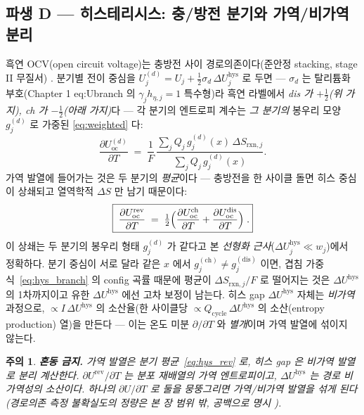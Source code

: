 \documentclass[11pt,a4paper]{article}
\newtheorem*{warnbox}{주의}
\newcommand{\rxn}{\mathrm{rxn}}
\newcommand{\rev}{\mathrm{rev}}
\newcommand{\oc}{\mathrm{oc}}
\newcommand{\hys}{\mathrm{hys}}
\begin{document}
\subsection{파생 D — 히스테리시스: 충/방전 분기와 가역/비가역 분리}\label{ssec:hys}
흑연 OCV(open circuit voltage)는 충방전 사이 경로의존이다(준안정 stacking, stage II 무질서) \cite{hysteresis2018}. 분기별 전이 중심을
$U_j^{(d)}=U_j+\tfrac12\sigma_d\,\Delta U_j^\hys$ 로 두면 — $\sigma_d$ 는 탈리튬화 부호(Chapter 1 eq:Ubranch 의
$\gamma_jh_{\eta,j}{=}1$ 특수형)라 흑연 라벨에서 \emph{dis 가 $+\tfrac12$(위 가지), ch 가 $-\tfrac12$(아래 가지)}다 —
각 분기의 엔트로피 계수는 \emph{그 분기의} 봉우리 모양 $g_j^{(d)}$ 로 가중된 \eqref{eq:weighted} 다:
\begin{equation}
\frac{\partial U_\oc^{(d)}}{\partial T}
\;=\;\frac1F\,\frac{\sum_j Q_j\,g_j^{(d)}(x)\,\Delta S_{\rxn,j}}{\sum_j Q_j\,g_j^{(d)}(x)}.
\label{eq:hys_branch}
\end{equation}
가역 발열에 들어가는 것은 두 분기의 \emph{평균}이다 — 충방전을 한 사이클 돌면 히스 중심이 상쇄되고 열역학적
$\Delta S$ 만 남기 때문이다:
\begin{equation}
\boxed{\;\frac{\partial U_\oc^\rev}{\partial T}
\;=\;\tfrac12\Bigl(\frac{\partial U_\oc^\mathrm{ch}}{\partial T}+\frac{\partial U_\oc^\mathrm{dis}}{\partial T}\Bigr)\;.}
\label{eq:hys_rev}
\end{equation}
이 상쇄는 두 분기의 봉우리 형태 $g_j^{(d)}$ 가 같다고 본 \emph{선형화 근사}($\Delta U_j^\hys\!\ll\!w_j$)에서 정확하다.
분기 중심이 서로 달라 같은 $x$ 에서 $g_j^{(\mathrm{ch})}\!\ne\!g_j^{(\mathrm{dis})}$ 이면, 겹침
가중식~\eqref{eq:hys_branch} 의 config 곡률 때문에 평균이 $\Delta S_{\rxn,j}/F$ 로 떨어지는 것은
$\Delta U^\hys$ 의 1차까지이고 유한 $\Delta U^\hys$ 에선 고차 보정이 남는다.
히스 gap $\Delta U^\hys$ 자체는 \emph{비가역} 과정으로, $\propto I\,\Delta U^\hys$ 의 소산율(한 사이클당
$\propto Q_\mathrm{cycle}\,\Delta U^\hys$ 의 소산(entropy production) 열)을 만든다 — 이는 온도 미분 $\partial/\partial T$ 와 \emph{별개}이며 가역 발열에 섞이지 않는다.
\begin{warnbox}
\textbf{혼동 금지.} 가역 발열은 분기 평균~\eqref{eq:hys_rev} 로, 히스 gap 은 비가역 발열로 \emph{분리} 계산한다.
$\partial U^\rev/\partial T$ 는 분포 재배열의 가역 엔트로피이고, $\Delta U^\hys$ 는 경로 비가역성의 소산이다.
하나의 $\partial U/\partial T$ 로 둘을 뭉뚱그리면 가역/비가역 발열을 섞게 된다(경로의존 측정 불확실도의
정량은 본 장 범위 밖, 공백으로 명시 \cite{hysteresis2018}).
\end{warnbox}
\end{document}
